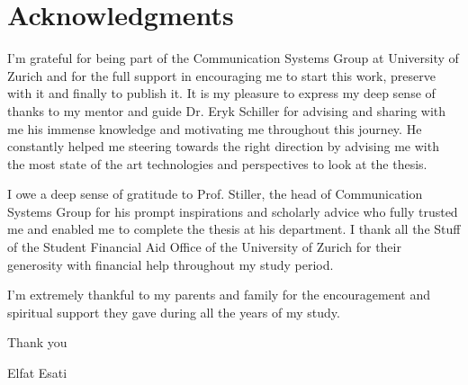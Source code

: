\chapter*{Acknowledgments}



I'm grateful for being part of the Communication Systems Group at University of Zurich and for the full support in encouraging me to start this work, preserve with it and finally to publish it. 
It is my pleasure to express my deep sense of thanks to my mentor and guide Dr. Eryk Schiller for advising and sharing with me his immense knowledge and motivating me throughout this journey. He constantly helped me steering towards the right direction by advising me with the most state of the art technologies and perspectives to look at the thesis.

I owe a deep sense of gratitude to Prof. Stiller, the head of Communication Systems Group for his prompt inspirations and scholarly advice who fully trusted me and enabled me to complete the thesis at his department. 
I thank all the Stuff of the Student Financial Aid Office of the University of Zurich for their generosity with financial help throughout my study period. 

I'm extremely thankful to my parents and family for the encouragement and spiritual support they gave during all the years of my study. 


\vspace{.5cm}
Thank you

\vspace{1cm}
Elfat Esati


